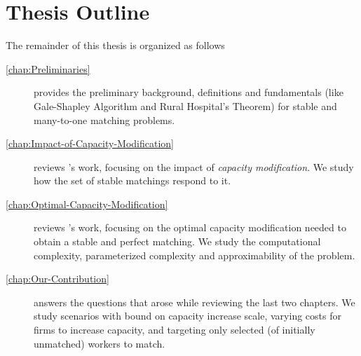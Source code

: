 \section{Thesis Outline}

The remainder of this thesis is organized as follows

\begin{description}
  \item[\autoref{chap:Preliminaries}] provides the preliminary background, definitions and fundamentals (like Gale-Shapley Algorithm and Rural Hospital's Theorem) for stable and many-to-one matching problems.
  \item[\autoref{chap:Impact-of-Capacity-Modification}] reviews 's \cite{gokhale2024capacity} work, focusing on the impact of \textit{capacity modification}. We study how the set of stable matchings respond to it.
  \item[\autoref{chap:Optimal-Capacity-Modification}] reviews 's \cite{chen2024optimal} work, focusing on the optimal capacity modification needed to obtain a stable and perfect matching. We study the computational complexity, parameterized complexity and approximability of the problem.
  \item[\autoref{chap:Our-Contribution}] answers the questions that arose while reviewing the last two chapters. We study scenarios with bound on capacity increase scale, varying costs for firms to increase capacity, and targeting only selected (of initially unmatched) workers to match.
\end{description}
